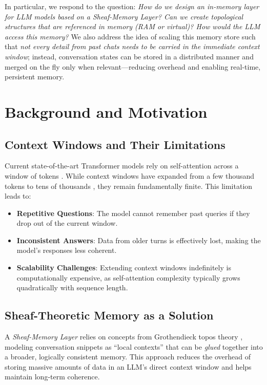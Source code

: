 \documentclass{article}
\begin{document}
In particular, we respond to the question: \emph{How do we design an in-memory layer for LLM models based on a Sheaf-Memory Layer? Can we create topological structures that are referenced in memory (RAM or virtual)? How would the LLM access this memory?} We also address the idea of scaling this memory store such that \emph{not every detail from past chats needs to be carried in the immediate context window}; instead, conversation states can be stored in a distributed manner and merged on the fly only when relevant---reducing overhead and enabling real-time, persistent memory.

\section{Background and Motivation}

\subsection{Context Windows and Their Limitations}

Current state-of-the-art Transformer models rely on self-attention across a window of tokens \citep{vaswani2017attention}. While context windows have expanded from a few thousand tokens to tens of thousands \citep{rae2023scaling}, they remain fundamentally finite. This limitation leads to:
\begin{itemize}
    \item \textbf{Repetitive Questions}: The model cannot remember past queries if they drop out of the current window.
    \item \textbf{Inconsistent Answers}: Data from older turns is effectively lost, making the model's responses less coherent.
    \item \textbf{Scalability Challenges}: Extending context windows indefinitely is computationally expensive, as self-attention complexity typically grows quadratically with sequence length.
\end{itemize}

\subsection{Sheaf-Theoretic Memory as a Solution}

A \emph{Sheaf-Memory Layer} relies on concepts from Grothendieck topos theory \citep{grothendieck1972}, modeling conversation snippets as ``local contexts'' that can be \emph{glued} together into a broader, logically consistent memory. This approach reduces the overhead of storing massive amounts of data in an LLM's direct context window and helps maintain long-term coherence.
\end{document}
